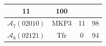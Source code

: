\begin{table}[!t]
\begin{tabular}{|c|c||c|c|}
11

&

100

\\ \hline

$\mathcal{A}_{7}(02010)$

&

MKP3


&

11

&

98

\\ \hline

$\mathcal{A}_{8}(02121)$

&

Tfr


&

0

&

94

\\ \hline

 
\end{tabular}
\end{table}
